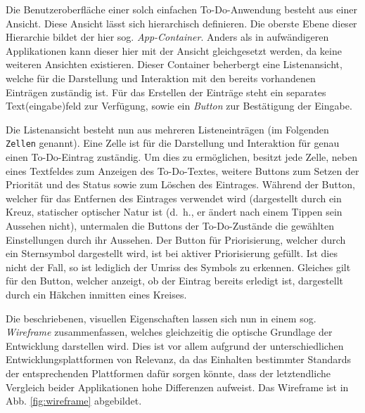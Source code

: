 Die Benutzeroberfläche einer solch einfachen To-Do-Anwendung besteht aus einer Ansicht. Diese Ansicht lässt sich hierarchisch definieren. Die oberste Ebene dieser Hierarchie bildet der hier sog. \textit{App-Container}. Anders als in aufwändigeren Applikationen kann dieser hier mit der Ansicht gleichgesetzt werden, da keine weiteren Ansichten existieren. Dieser Container beherbergt eine Listenansicht, welche für die Darstellung und Interaktion mit den bereits vorhandenen Einträgen zuständig ist. Für das Erstellen der Einträge steht ein separates Text(eingabe)feld zur Verfügung, sowie ein \textit{Button} zur Bestätigung der Eingabe.

Die Listenansicht besteht nun aus mehreren Listeneinträgen (im Folgenden \texttt{Zellen} genannt). Eine Zelle ist für die Darstellung und Interaktion für genau einen To-Do-Eintrag zuständig. Um dies zu ermöglichen, besitzt jede Zelle, neben eines Textfeldes zum Anzeigen des To-Do-Textes, weitere Buttons zum Setzen der Priorität und des Status sowie zum Löschen des Eintrages. Während der Button, welcher für das Entfernen des Eintrages verwendet wird (dargestellt durch ein Kreuz, statischer optischer Natur ist (d.\ h., er ändert nach einem Tippen sein Aussehen nicht), untermalen die Buttons der To-Do-Zustände die gewählten Einstellungen durch ihr Aussehen. Der Button für Priorisierung, welcher durch ein Sternsymbol dargestellt wird, ist bei aktiver Priorisierung gefüllt. Ist dies nicht der Fall, so ist lediglich der Umriss des Symbols zu erkennen. Gleiches gilt für den Button, welcher anzeigt, ob der Eintrag bereits erledigt ist, dargestellt durch ein Häkchen inmitten eines Kreises.

Die beschriebenen, visuellen Eigenschaften lassen sich nun in einem sog. \textit{Wireframe} zusammenfassen, welches gleichzeitig die optische Grundlage der Entwicklung darstellen wird. Dies ist vor allem aufgrund der unterschiedlichen Entwicklungsplattformen von Relevanz, da das Einhalten bestimmter Standards der entsprechenden Plattformen dafür sorgen könnte, dass der letztendliche Vergleich beider Applikationen hohe Differenzen aufweist. Das Wireframe ist in Abb. \ref{fig:wireframe} abgebildet.

